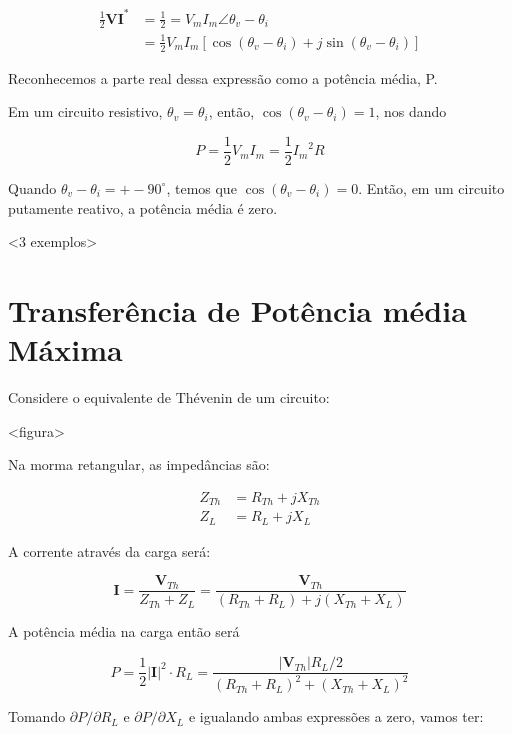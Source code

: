 \begin{align}
 \frac{1}{2} \mathbf{V}\mathbf{I^*} &= \frac{1}{2} = V_m I_m \angle \theta_v - \theta_i \\
 &= \frac{1}{2} V_m I_m [\cos(\theta_v - \theta_i) + j \sin(\theta_v - \theta_i)]
\end{align}

Reconhecemos a parte real dessa expressão como a potência média, P.

Em um circuito resistivo, $\theta_v = \theta_i$, então, $\cos(\theta_v - \theta_i) = 1$, nos dando

\begin{equation}
 P = \frac{1}{2} V_m I_m = \frac{1}{2} {I_m}^2 R
\end{equation}

Quando $\theta_v - \theta_i = +- 90^{\circ}$, temos que $\cos(\theta_v - \theta_i) = 0$. Então, em um circuito putamente reativo, a potência média é zero.

<3 exemplos>

\section{Transferência de Potência média Máxima}

Considere o equivalente de Thévenin de um circuito:

<figura>

Na morma retangular, as impedâncias são:

\begin{align}
 Z_{Th} &= R_{Th} + j X_{Th} \\
 Z_L &= R_L + j X_L
\end{align}

A corrente através da carga será:

\begin{equation}
 \mathbf{I} = \frac{\mathbf{V}_{Th}}{Z_{Th} + Z_L} = \frac{\mathbf{V}_{Th}}{(R_{Th} + R_L) + j (X_{Th} + X_L)}
\end{equation}

A potência média na carga então será

\begin{equation} \label{potencia}
 P = \frac{1}{2} |\mathbf{I}|^2 \cdot R_L = \frac{|\mathbf{V}_{Th}| R_L / 2}{(R_{Th} + R_L)^2 + (X_{Th} + X_L)^2}
\end{equation}

Tomando $\partial P / \partial R_L$ e $\partial P / \partial X_L$ e igualando ambas expressões a zero, vamos ter:

